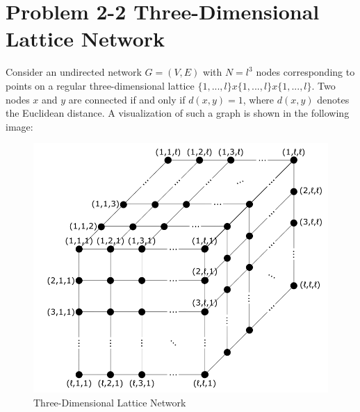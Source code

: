 \section{Problem 2-2 Three-Dimensional Lattice Network}

Consider an undirected network $G = (V,E)$ with $N = l^3$ nodes corresponding to points on a regular three-dimensional lattice $\{1,...,l\}x\{1,...,l\}x\{1,...,l\}$. Two nodes $x$ and $y$ are connected if and only if $d(x,y) = 1$, where $d(x,y)$ denotes the Euclidean distance. A visualization of such a graph is shown in the following image:

\begin{figure}[ht]
	\centering
	\includegraphics[width=0.7\linewidth]{content/lattice.png}
	\caption{Three-Dimensional Lattice Network}
	\label{fig:lattice}
\end{figure}

